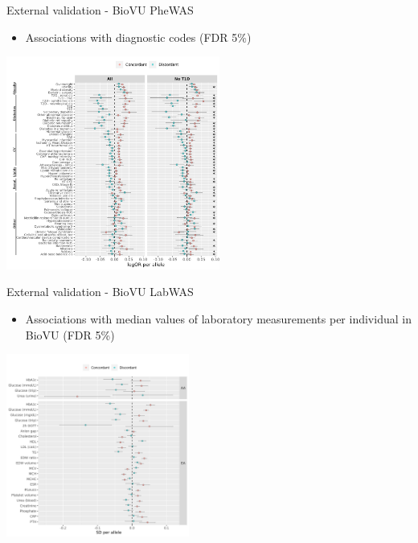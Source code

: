\documentclass[presentation]{beamer}
\begin{document}
\begin{frame}[label={sec:org62f9d73}]{External validation - BioVU PheWAS}
\begin{itemize}
\item Associations with diagnostic codes (FDR 5\%)
\end{itemize}
\begin{center}
\includegraphics[width=7cm]{./plots/biovu_pw.png}
\end{center}
\end{frame}

\begin{frame}[label={sec:org056936b}]{External validation - BioVU LabWAS}
\begin{itemize}
\item Associations with median values of laboratory measurements per individual in BioVU (FDR 5\%)
\end{itemize}
\begin{center}
\includegraphics[width=6cm]{./plots/lw_biovu.png}
\end{center}
\end{frame}
\end{document}
